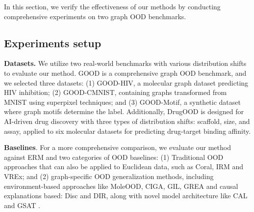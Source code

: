 In this section, we verify the effectiveness of our methods by conducting comprehensive experiments on two graph OOD benchmarks. 
\subsection{Experiments setup}
\textbf{Datasets.} We utilize two real-world benchmarks with various distribution shifts to evaluate our method. GOOD is a comprehensive graph OOD benchmark, and we selected three datasets: (1) GOOD-HIV, a molecular graph dataset predicting HIV inhibition; (2) GOOD-CMNIST, containing graphs transformed from MNIST using superpixel techniques; and (3) GOOD-Motif, a synthetic dataset where graph motifs determine the label. Additionally, DrugOOD is designed for AI-driven drug discovery with three types of distribution shifts: scaffold, size, and assay, applied to six molecular datasets for predicting drug-target binding affinity.

\textbf{Baselines}.  For a more comprehensive comparison, we evaluate our method against ERM and two categories of OOD baselines: (1) Traditional OOD approaches that can also be applied to Euclidean data, such as Coral, IRM and VREx; and (2) graph-specific OOD generalization methods, including environment-based approaches like MoleOOD, CIGA, GIL, GREA and causal explanations based: Disc and DIR, along with novel model architecture like CAL and GSAT .

